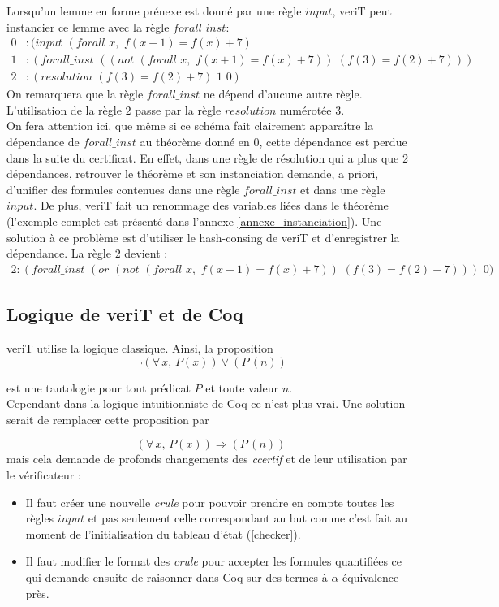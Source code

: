 \documentclass[11pt]{article}
\begin{document}
Lorsqu'un lemme en forme prénexe est donné par une règle $input$, veriT peut instancier ce lemme avec la règle $forall\_inst$: 
\begin{align*}
0&:(input \,\,(forall\,\, x,\,\, f (x+1) = f(x)+7) \\
1&:(forall\_inst \,\,((not \,\,(forall\,\, x, \,\,f (x+1) = f(x)+7)) \,\,(f (3) = f(2)+7)) )\\
2&:(resolution  \,\, (f (3) = f(2)+7) \,\,1 \,\,0) 
\end{align*}
On remarquera que la règle $forall\_inst$ ne dépend d'aucune autre règle. L'utilisation de la règle $2$ passe par la règle $resolution$ numérotée $3$.\\


On fera attention ici, que même si ce schéma fait clairement apparaître la dépendance de $forall\_inst$ au théorème donné en $0$, cette dépendance est perdue dans la suite du certificat. En effet, dans une règle de résolution qui a plus que 2 dépendances, retrouver le théorème et son instanciation demande, a priori, d'unifier des formules contenues dans une règle $forall\_inst$ et dans une règle $input$. De plus, veriT fait un renommage des variables liées dans le théorème (l'exemple complet est présenté dans l'annexe \ref{annexe_instanciation}). Une solution à ce problème est d'utiliser le hash-consing de veriT et d'enregistrer la dépendance. La règle $2$ devient : 
\begin{align*}
2:(forall\_inst \,\, (or\,\, (not \,\,(forall \,\,x, \,\,f (x+1) = f(x)+7)) \,\,(f (3) = f(2)+7))) \,\,0) 
\end{align*}


\subsection{Logique de veriT et de Coq}
veriT utilise la logique classique. Ainsi, la proposition 
\[  \neg (\forall \, x, \, P(x)) \vee (P \, (n)) \]

est une tautologie pour tout prédicat $P$ et toute valeur $n$. \\

Cependant dans la logique intuitionniste de Coq ce n'est plus vrai. Une solution serait de remplacer cette proposition par 

\[   (\forall \, x, \, P(x)) \Rightarrow (P \, (n)) \]
mais cela demande de profonds changements des \textit{ccertif} et de leur utilisation par le vérificateur : 
\begin{itemize}

\item Il faut créer une nouvelle \textit{crule} pour pouvoir prendre en compte toutes les règles $input$ et pas seulement celle correspondant au but comme c'est fait au moment de l'initialisation du tableau d'état (\ref{checker}).
\item Il faut modifier le format des \textit{crule} pour accepter les formules quantifiées ce qui demande ensuite de raisonner dans Coq sur des termes à $\alpha$-équivalence près.
\end{itemize}
\end{document}
